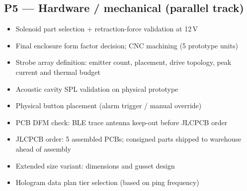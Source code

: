 \documentclass[11pt,a4paper]{article}
\newcommand{\todo}{$\square$}
\begin{document}
\subsection{P5 --- Hardware / mechanical (parallel track)}

\begin{itemize}
  \item[\todo] Solenoid part selection + retraction-force validation at 12\,V
  \item[\todo] Final enclosure form factor decision; CNC machining (5 prototype units)
  \item[\todo] Strobe array definition: emitter count, placement, drive topology, peak current and thermal budget
  \item[\todo] Acoustic cavity SPL validation on physical prototype
  \item[\todo] Physical button placement (alarm trigger / manual override)
  \item[\todo] PCB DFM check: BLE trace antenna keep-out before JLCPCB order
  \item[\todo] JLCPCB order: 5 assembled PCBs; consigned parts shipped to warehouse ahead of assembly
  \item[\todo] Extended size variant: dimensions and gusset design
  \item[\todo] Hologram data plan tier selection (based on ping frequency)
\end{itemize}
\end{document}

